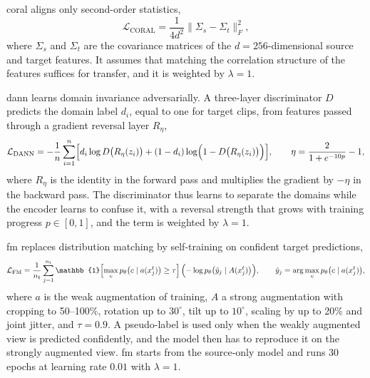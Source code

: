 \documentclass[]{interact}
\begin{document}
\ac{coral} \citep{sun2016deepcoral} aligns only second-order statistics,
\begin{equation}
  \mathcal{L}_{\mathrm{CORAL}}=\frac{1}{4d^2}\bigl\|\Sigma_s-\Sigma_t\bigr\|_F^2,
  \label{eq:coral}
\end{equation}
where $\Sigma_s$ and $\Sigma_t$ are the covariance matrices of the
$d=256$-dimensional source and target features. It assumes that matching the
correlation structure of the features suffices for transfer, and it is weighted
by $\lambda=1$.

\ac{dann} \citep{ganin2016dann} learns domain invariance adversarially. A
three-layer discriminator $D$ predicts the domain label $d_i$, equal to one for
target clips, from features passed through a gradient reversal layer
$R_\eta$,
\begin{equation}
  \mathcal{L}_{\mathrm{DANN}}=-\frac{1}{n}\sum_{i=1}^{n}
  \Bigl[d_i\log D\bigl(R_\eta(z_i)\bigr)+(1-d_i)\log\Bigl(1-D\bigl(R_\eta(z_i)\bigr)\Bigr)\Bigr],
  \qquad\eta=\frac{2}{1+e^{-10p}}-1,
  \label{eq:dann}
\end{equation}
where $R_\eta$ is the identity in the forward pass and multiplies the gradient
by $-\eta$ in the backward pass. The discriminator thus learns to separate the
domains while the encoder learns to confuse it, with a reversal strength that
grows with training progress $p\in[0,1]$, and the term is weighted by
$\lambda=1$.

\ac{fm} \citep{sohn2020fixmatch} replaces distribution matching by
self-training on confident target predictions,
\begin{equation}
  \mathcal{L}_{\mathrm{FM}}=\frac{1}{n_t}\sum_{j=1}^{n_t}
  \mathbb{1}\Bigl[\max_c p_\theta\bigl(c\mid a(x_j^t)\bigr)\ge\tau\Bigr]\,
  \Bigl(-\log p_\theta\bigl(\hat{y}_j\mid A(x_j^t)\bigr)\Bigr),\qquad
  \hat{y}_j=\arg\max_c p_\theta\bigl(c\mid a(x_j^t)\bigr),
  \label{eq:fm}
\end{equation}
where $a$ is the weak augmentation of training, $A$ a strong augmentation with
cropping to 50--100\%, rotation up to $30^\circ$, tilt up to $10^\circ$,
scaling by up to 20\% and joint jitter, and $\tau=0.9$. A pseudo-label is used
only when the weakly augmented view is predicted confidently, and the model
then has to reproduce it on the strongly augmented view. \ac{fm} starts from
the source-only model and runs 30 epochs at learning rate $0.01$ with
$\lambda=1$.
\end{document}
